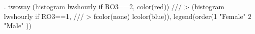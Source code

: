 . twoway (histogram lwshourly if RO3==2, color(red)) ///
>        (histogram lwshourly if RO3==1, ///
>            fcolor(none) lcolor(blue)), legend(order(1 "Female" 2 "Male" ))
{\smallskip}

